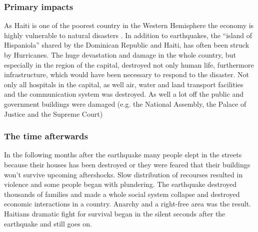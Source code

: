 \documentclass[11pt]{article}
\begin{document}
\subsubsection*{Primary impacts}
As Haiti is one of the poorest country in the Western Hemisphere \cite{web:unicef}  the economy is highly vulnerable to natural disasters . In addition to earthquakes, the “island of Hispaniola” shared by the Dominican Republic and Haiti, has often been struck by Hurricanes. 
\newline
The huge devastation and damage in the whole country, but especially in the region of the capital, destroyed not only human life, furthermore infrastructure, which would have been necessary to respond to the disaster. Not only all hospitals in the capital, as well air, water and land transport facilities and the communication system was destroyed. As well a lot off the public and government buildings were damaged (e.g. the National Assembly, the Palace of Justice and the Supreme Court) 


\subsubsection*{The time afterwards}

In the following months after the earthquake many people slept in the streets because their houses has been destroyed or they were feared that their buildings won’t survive upcoming aftershocks. Slow distribution of recourses resulted in violence and some people began with plundering. 
\newline
The earthquake destroyed thousands of families and made  a whole social system collapse and destroyed economic interactions in a country. Anarchy and a right-free area was the result. Haitians dramatic fight for survival began in the silent seconds after the earthquake and still goes on.
\end{document}
